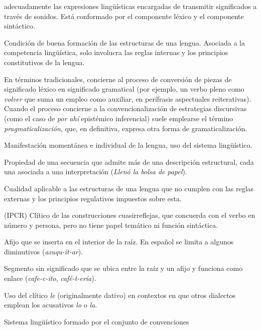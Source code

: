 \begin{glosariogeneral}
        adecuadamente las expresiones lingüísticas encargadas de transmitir
        significados a través de sonidos. Está conformado por el componente
        léxico y el componente sintáctico.
  \item[Gramaticalidad:] Condición de buena formación de las estructuras de una
        lengua. Asociada a la competencia lingüística, solo involucra las reglas
        internas y los principios constitutivos de la lengua.
  \item[Gramaticalización/pragmaticalización:] En términos tradicionales,
        concierne al proceso de conversión de piezas de significado léxico en
        significado gramatical (por ejemplo, un verbo pleno como \textit{volver}
        que suma un empleo como auxiliar, en perífrasis aspectuales
        reiterativas). Cuando el proceso concierne a la convencionalización de
        estrategias discursivas (como el caso de \textit{por ahí} epistémico
        inferencial) suele emplearse el término \textit{pragmaticalización},
        que, en definitiva, expresa otra forma de gramaticalización.
  \item[Habla:] Manifestación momentánea e individual de la lengua, uso del
        sistema lingüístico.
  \item[Homonimia estructural:] Propiedad de una secuencia que admite más de
        una descripción estructural, cada una asociada a una interpretación
        (\textit{Llenó la bolsa de papel}).
  \item[Incorrección:] Cualidad aplicable a las estructuras de una lengua que no
        cumplen con las reglas externas y los principios regulativos impuestos
        sobre esta.
  \item[Índice pronominal cuasirreflejo:] (IPCR) Clítico de las construcciones
        cuasirreflejas, que concuerda con el verbo en número y persona, pero no
        tiene papel temático ni función sintáctica.
  \item[Infijo:] Afijo que se inserta en el interior de la raíz. En español se
        limita a algunos diminutivos (\textit{azuqu-ít-ar}).
  \item[Interfijo:] Segmento sin significado que se ubica entre la raíz y un
        afijo y funciona como enlace (\textit{cafe-c-ito}, \textit{café-t-ería}).
  \item[Leísmo:] Uso del clítico \textit{le} (originalmente dativo) en
        contextos en que otros dialectos emplean los acusativos \textit{lo} o
        \textit{la}.
  \item[Lengua:] Sistema lingüístico formado por el conjunto de convenciones

\end{glosariogeneral}
